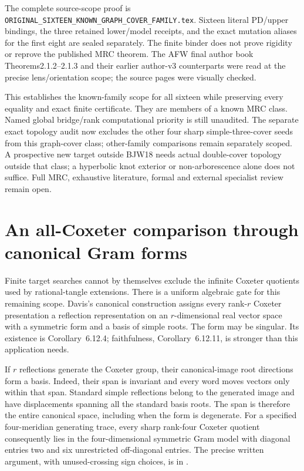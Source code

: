 \documentclass[11pt]{article}
\begin{document}
The complete source-scope proof is
\texttt{ORIGINAL\_SIXTEEN\_KNOWN\_GRAPH\_COVER\_FAMILY.tex}.
Sixteen literal PD/upper bindings, the three retained lower/model receipts,
and the exact mutation aliases for the first eight are sealed separately.
The finite binder does not prove rigidity or reprove the published MRC
theorem. The AFW final author book Theorems2.1.2--2.1.3 and their earlier
author-v3 counterparts were read at the precise lens/orientation scope;
the source pages were visually checked.

This establishes the known-family scope for all sixteen while preserving
every equality and exact finite certificate. They are members of a known
MRC class. Named global bridge/rank computational priority
is still unaudited. The separate exact topology audit now excludes the
other four sharp simple-three-cover seeds from this graph-cover class;
other-family comparisons remain separately scoped. A prospective new target outside BJW18 needs
actual double-cover topology outside that class; a hyperbolic knot exterior
or non-arborescence alone does not suffice. Full MRC, exhaustive literature,
formal and external specialist review remain open.

\section{An all-Coxeter comparison through canonical Gram forms}

Finite target searches cannot by themselves exclude the infinite
Coxeter quotients used by rational-tangle extensions.  There is a
uniform algebraic gate for this remaining scope.  Davis's canonical
construction \cite[Section~6.12]{davis25} assigns every rank-$r$
Coxeter presentation a reflection representation on an $r$-dimensional
real vector space with a symmetric form and a basis of simple roots.
The form may be singular.  Its existence is Corollary~6.12.4;
faithfulness, Corollary~6.12.11, is stronger than this application needs.

If $r$ reflections generate the Coxeter group, their canonical-image
root directions form a basis.  Indeed, their span is invariant and
every word moves vectors only within that span.  Standard simple
reflections belong to the generated image and have displacements
spanning all the standard basis roots.  The span is therefore the
entire canonical space, including when the form is degenerate.
For a specified four-meridian generating trace, every sharp rank-four
Coxeter quotient consequently lies in the four-dimensional symmetric Gram
model with diagonal entries two and six unrestricted off-diagonal
entries.  The precise written argument, with unused-crossing sign
choices, is in .
\end{document}
